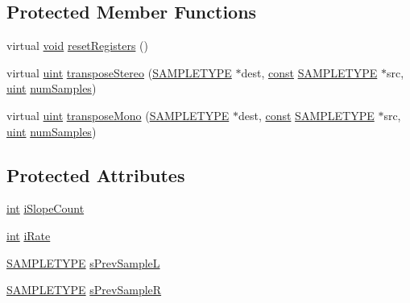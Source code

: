 \subsection*{Protected Member Functions}
\begin{DoxyCompactItemize}
\item 
virtual \hyperlink{sound_8c_ae35f5844602719cf66324f4de2a658b3}{void} \hyperlink{class_rate_transposer_integer_a76a752939bce1e3ccdc6fdf295a5fddf}{reset\+Registers} ()
\item 
virtual \hyperlink{_s_t_types_8h_a91ad9478d81a7aaf2593e8d9c3d06a14}{uint} \hyperlink{class_rate_transposer_integer_aff1875a0b6c13f9468c7385434325b20}{transpose\+Stereo} (\hyperlink{namespacesoundtouch_a97cfd29a7abb4d4b2a72f803d5b5850c}{S\+A\+M\+P\+L\+E\+T\+Y\+PE} $\ast$dest, \hyperlink{getopt1_8c_a2c212835823e3c54a8ab6d95c652660e}{const} \hyperlink{namespacesoundtouch_a97cfd29a7abb4d4b2a72f803d5b5850c}{S\+A\+M\+P\+L\+E\+T\+Y\+PE} $\ast$src, \hyperlink{_s_t_types_8h_a91ad9478d81a7aaf2593e8d9c3d06a14}{uint} \hyperlink{classsoundtouch_1_1_f_i_f_o_processor_a254a8506a4a93083c0e914aff361c674}{num\+Samples})
\item 
virtual \hyperlink{_s_t_types_8h_a91ad9478d81a7aaf2593e8d9c3d06a14}{uint} \hyperlink{class_rate_transposer_integer_a2b5c693ffd3a64fa4f77161d1f7e7783}{transpose\+Mono} (\hyperlink{namespacesoundtouch_a97cfd29a7abb4d4b2a72f803d5b5850c}{S\+A\+M\+P\+L\+E\+T\+Y\+PE} $\ast$dest, \hyperlink{getopt1_8c_a2c212835823e3c54a8ab6d95c652660e}{const} \hyperlink{namespacesoundtouch_a97cfd29a7abb4d4b2a72f803d5b5850c}{S\+A\+M\+P\+L\+E\+T\+Y\+PE} $\ast$src, \hyperlink{_s_t_types_8h_a91ad9478d81a7aaf2593e8d9c3d06a14}{uint} \hyperlink{classsoundtouch_1_1_f_i_f_o_processor_a254a8506a4a93083c0e914aff361c674}{num\+Samples})
\end{DoxyCompactItemize}
\subsection*{Protected Attributes}
\begin{DoxyCompactItemize}
\item 
\hyperlink{xmltok_8h_a5a0d4a5641ce434f1d23533f2b2e6653}{int} \hyperlink{class_rate_transposer_integer_aff8e7ba3728334ab0d0c7c74aa463f7a}{i\+Slope\+Count}
\item 
\hyperlink{xmltok_8h_a5a0d4a5641ce434f1d23533f2b2e6653}{int} \hyperlink{class_rate_transposer_integer_ad8952aa4ee684d045ba0c45969a5bdcf}{i\+Rate}
\item 
\hyperlink{namespacesoundtouch_a97cfd29a7abb4d4b2a72f803d5b5850c}{S\+A\+M\+P\+L\+E\+T\+Y\+PE} \hyperlink{class_rate_transposer_integer_aec25931842437d0c1b6fb753f23d08f2}{s\+Prev\+SampleL}
\item 
\hyperlink{namespacesoundtouch_a97cfd29a7abb4d4b2a72f803d5b5850c}{S\+A\+M\+P\+L\+E\+T\+Y\+PE} \hyperlink{class_rate_transposer_integer_a411bd9f2d245a437719a3a1691acd3c0}{s\+Prev\+SampleR}
\end{DoxyCompactItemize}
